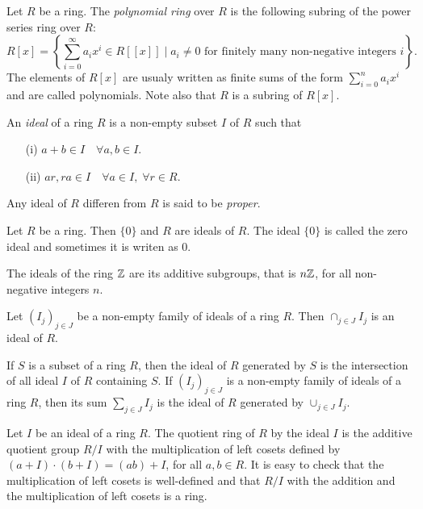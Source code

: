\begin{example}
	Let $R$ be a ring. The {\em polynomial ring} over $R$ is the following subring of the power series ring over $R$:
	$$R[x]=\left\{ \sum_{i=0}^{\infty}a_ix^{i}\in R[[x]] \mid a_i\neq 0 \mbox{ for finitely many non-negative integers } i \right\}.$$
	The elements of $R[x]$ are usualy written as finite sums of the form $\sum_{i=0}^na_ix^{i}$ and are called polynomials. Note also that $R$ is a subring of $R[x]$.
	\end{example}

An {\em ideal} of a ring $R$ is a non-empty subset $I$ of $R$ such that
\begin{itemize}
	\item[(i)] $a+b\in I\quad\forall a,b\in I$.
\item[(ii)] $ar,ra\in I\quad\forall a\in I,\;\forall r\in R$.
\end{itemize}
Any ideal of $R$ differen from $R$ is said to be {\em proper}.


\begin{example}
Let $R$ be a ring. Then $\{ 0\}$ and $R$ are ideals of $R$. The ideal $\{ 0\}$
is called the zero ideal and sometimes it is writen as $0$.
\end{example}

\begin{example}
The ideals of the ring $\mathbb{Z}$ are its additive subgroups, that is $n\mathbb{Z}$, for all non-negative integers $n$.
\end{example}


\begin{example} Let $(I_j)_{j\in J}$ be a non-empty family of ideals of a ring $R$. Then $\cap_{j\in J}I_j$ is an ideal of $R$.
\end{example}

If $S$ is a subset of a ring $R$, then the ideal of $R$ generated by $S$ 
is the intersection of all ideal $I$ of $R$ containing $S$. If
$(I_j)_{j\in J}$ is a non-empty family of ideals of a ring $R$, then its sum $\sum_{j\in J}I_j$ is the ideal of $R$ generated by
$\cup_{j\in  J}I_j$.

Let $I$ be an ideal of a ring $R$. The quotient ring of $R$ by the ideal $I$ is the additive quotient group
$R/I$ with the multiplication of left cosets defined by $(a+I)\cdot (b+I)=(ab)+I$, for all $a,b\in R$. It is easy to check that the multiplication of left cosets is well-defined and that $R/I$ with the addition and the multiplication of left cosets is a ring.




